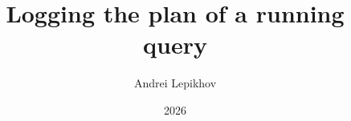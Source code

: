 %

\documentclass{beamer}
\usepackage[english]{babel}

\usepackage{tikz}
\usetikzlibrary{positioning,calc,arrows.meta}



\title[pg\_log\_query\_plan]{Logging the plan of a running query}
\author{Andrei Lepikhov}
\date{2026}



